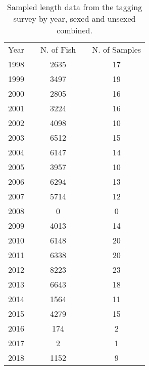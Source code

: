 \begingroup\fontsize{10}{12}\selectfont
\begingroup\fontsize{10}{12}\selectfont


\begin{table}[]
\caption{Sampled length data from the tagging survey by year, sexed and unsexed combined.}
\label{tab:survey_sample_indices}
\begin{tabular}{ccccc}
\multicolumn{1}{l}{Year} & \multicolumn{1}{l}{} & \multicolumn{1}{l}{N. of Fish} & \multicolumn{1}{l}{} & \multicolumn{1}{l}{N. of Samples} \\
1998 &  & 2635 &  & 17 \\
1999 &  & 3497 &  & 19 \\
2000 &  & 2805 &  & 16 \\
2001 &  & 3224 &  & 16 \\
2002 &  & 4098 &  & 10 \\
2003 &  & 6512 &  & 15 \\
2004 &  & 6147 &  & 14 \\
2005 &  & 3957 &  & 10 \\
2006 &  & 6294 &  & 13 \\
2007 &  & 5714 &  & 12 \\
2008 &  & 0 &  & 0 \\
2009 &  & 4013 &  & 14 \\
2010 &  & 6148 &  & 20 \\
2011 &  & 6338 &  & 20 \\
2012 &  & 8223 &  & 23 \\
2013 &  & 6643 &  & 18 \\
2014 &  & 1564 &  & 11 \\
2015 &  & 4279 &  & 15 \\
2016 &  & 174 &  & 2 \\
2017 &  & 2 &  & 1 \\
2018 &  & 1152 &  & 9 \\ \hline
\end{tabular}
\end{table}
\endgroup{}
\endgroup{}